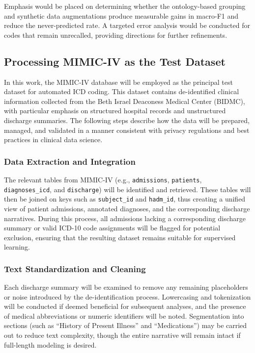 Emphasis would be placed on determining whether the ontology-based grouping and synthetic data augmentations produce measurable gains in macro-F1 and reduce the never-predicted rate. A targeted error analysis would be conducted for codes that remain unrecalled, providing directions for further refinements.

\subsection{Processing MIMIC-IV as the Test Dataset}\label{sec:p1:processing_mimic_iv}

In this work, the MIMIC-IV database will be employed as the principal test dataset for automated ICD coding. This dataset contains de-identified clinical information collected from the Beth Israel Deaconess Medical Center (BIDMC), with particular emphasis on structured hospital records and unstructured discharge summaries. The following steps describe how the data will be prepared, managed, and validated in a manner consistent with privacy regulations and best practices in clinical data science.

\subsubsection{Data Extraction and Integration}\label{sec:p1:data_extraction}
The relevant tables from MIMIC-IV (e.g., \texttt{admissions}, \texttt{patients}, \texttt{diagnoses\_icd}, and \texttt{discharge}) will be identified and retrieved. These tables will then be joined on keys such as \texttt{subject\_id} and \texttt{hadm\_id}, thus creating a unified view of patient admissions, annotated diagnoses, and the corresponding discharge narratives. During this process, all admissions lacking a corresponding discharge summary or valid ICD-10 code assignments will be flagged for potential exclusion, ensuring that the resulting dataset remains suitable for supervised learning.

\subsubsection{Text Standardization and Cleaning}\label{sec:p1:text_cleaning}
Each discharge summary will be examined to remove any remaining placeholders or noise introduced by the de-identification process. Lowercasing and tokenization will be conducted if deemed beneficial for subsequent analyses, and the presence of medical abbreviations or numeric identifiers will be noted. Segmentation into sections (such as ``History of Present Illness'' and ``Medications'') may be carried out to reduce text complexity, though the entire narrative will remain intact if full-length modeling is desired.

